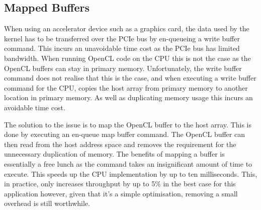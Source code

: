 \subsection{Mapped Buffers}

When using an accelerator device such as a graphics card, the data used by the
kernel has to be transferred over the PCIe bus by en-queueing a write buffer
command. This incurs an unavoidable time cost as the PCIe bus has limited
bandwidth. When running OpenCL code on the CPU this is not the case as the
OpenCL buffers can stay in primary memory. Unfortunately, the write buffer
command does not realise that this is the case, and when executing a write
buffer command for the CPU, copies the host array from primary memory to another
location in primary memory. As well as duplicating memory usage this incurs an
avoidable time cost.

The solution to the issue is to map the OpenCL buffer to the host array. This is
done by executing an en-queue map buffer command. The OpenCL buffer can then
read from the host address space and removes the requirement for the unnecessary
duplication of memory. The benefits of mapping a buffer is essentially a free
lunch as the command takes an insignificant amount of time to execute. This
speeds up the CPU implementation by up to ten milliseconds. This, in practice,
only increases throughput by up to 5\% in the best case for this application
however, given that it's a simple optimisation, removing a small overhead is
still worthwhile.
